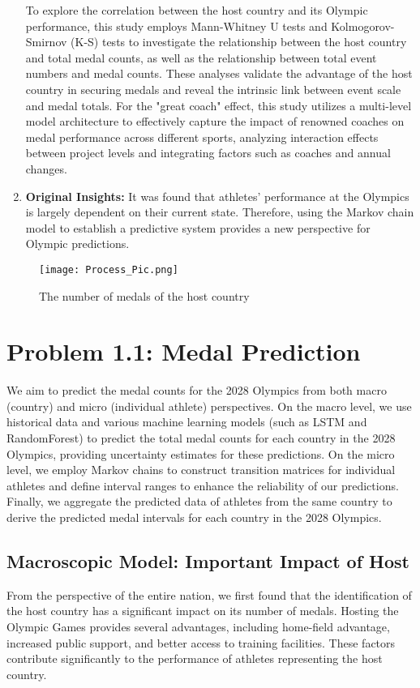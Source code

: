 \documentclass[12pt]{article}
\begin{document}
\begin{enumerate}
    To explore the correlation between the host country and its Olympic performance, this study employs Mann-Whitney U tests and Kolmogorov-Smirnov (K-S) tests to investigate the relationship between the host country and total medal counts, as well as the relationship between total event numbers and medal counts. These analyses validate the advantage of the host country in securing medals and reveal the intrinsic link between event scale and medal totals. For the "great coach" effect, this study utilizes a multi-level model architecture to effectively capture the impact of renowned coaches on medal performance across different sports, analyzing interaction effects between project levels and integrating factors such as coaches and annual changes.

    \item \textbf{Original Insights:}
    It was found that athletes' performance at the Olympics is largely dependent on their current state. Therefore, using the Markov chain model to establish a predictive system provides a new perspective for Olympic predictions.
\end{enumerate}

\begin{figure}[H]
    \centering
    \texttt{[image: Process\_Pic.png]}
    \caption{The number of medals of the host country}
    \label{fig:1}
\end{figure}

\section{Problem 1.1: Medal Prediction}

We aim to predict the medal counts for the 2028 Olympics from both macro (country) and micro (individual athlete) perspectives. On the macro level, we use historical data and various machine learning models (such as LSTM and RandomForest) to predict the total medal counts for each country in the 2028 Olympics, providing uncertainty estimates for these predictions. On the micro level, we employ Markov chains to construct transition matrices for individual athletes and define interval ranges to enhance the reliability of our predictions. Finally, we aggregate the predicted data of athletes from the same country to derive the predicted medal intervals for each country in the 2028 Olympics.

\subsection{Macroscopic Model: Important Impact of Host}
From the perspective of the entire nation, we first found that the identification of the host country has a significant impact on its number of medals. Hosting the Olympic Games provides several advantages, including home-field advantage, increased public support, and better access to training facilities. These factors contribute significantly to the performance of athletes representing the host country.
\end{document}
